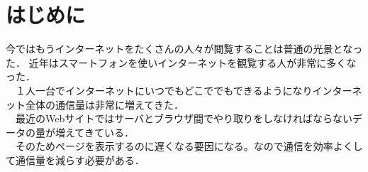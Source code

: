 \documentclass[a4j,9pt,twocolumn]{jsarticle}
\begin{document}





\section{はじめに}
今ではもうインターネットをたくさんの人々が閲覧することは普通の光景となった．
近年はスマートフォンを使いインターネットを観覧する人が非常に多くなった．
\\　１人一台でインターネットにいつでもどこででもできるようになりインターネット全体の通信量は非常に増えてきた．
\\　最近のWebサイトではサーバとブラウザ間でやり取りをしなければならないデータの量が増えてきている．
\\　そのためページを表示するのに遅くなる要因になる。なので通信を効率よくして通信量を減らす必要がある．
\end{document}
